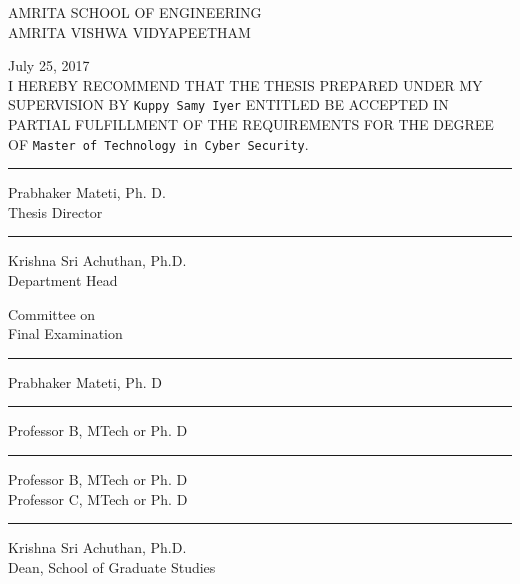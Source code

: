 \newpage
\thispagestyle{empty}

\begin{center}
AMRITA SCHOOL OF ENGINEERING \\
AMRITA VISHWA VIDYAPEETHAM\\
\end{center}

\hfill
July 25, 2017\\			%

I HEREBY RECOMMEND THAT THE THESIS PREPARED UNDER MY SUPERVISION BY
{\tt Kuppy Samy Iyer}		%
ENTITLED
{\tt \thesisTitle}
BE ACCEPTED IN PARTIAL FULFILLMENT OF THE
REQUIREMENTS FOR THE DEGREE OF
{\tt Master of Technology in Cyber Security}.\\


\hfill
\begin{minipage}{7cm}
\vskip 1cm\hrule\par\vskip 2mm
Prabhaker Mateti, Ph. D.\\	%
Thesis Director\\
\vskip 1cm\hrule\par\vskip 2mm
Krishna Sri Achuthan, Ph.D.\\
Department Head\\
\end{minipage}

\vfill
\begin{minipage}{7cm}
Committee on\\
Final Examination\\
\vskip 1cm\hrule\par\vskip 2mm
Prabhaker Mateti, Ph. D\\
\vskip 1cm\hrule\par\vskip 2mm
Professor B, MTech or Ph. D\\
\vskip 1cm\hrule\par\vskip 2mm
Professor B, MTech or Ph. D\\
Professor C, MTech or Ph. D\\
\vskip 1cm\hrule\par\vskip 2mm
Krishna Sri Achuthan, Ph.D.\\
Dean, School of Graduate Studies
\end{minipage}
